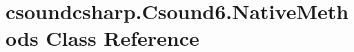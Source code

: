 \hypertarget{classcsoundcsharp_1_1_csound6_1_1_native_methods}{}\section{csoundcsharp.\+Csound6.\+Native\+Methods Class Reference}
\label{classcsoundcsharp_1_1_csound6_1_1_native_methods}
